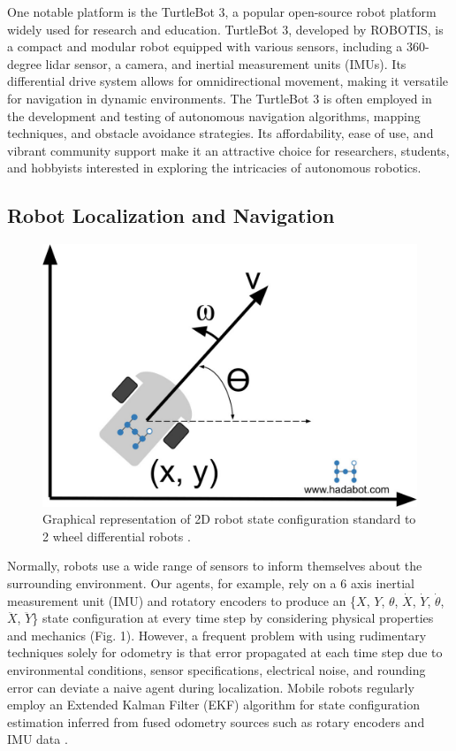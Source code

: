 \documentclass[conference]{IEEEtran}
\begin{document}
One notable platform is the TurtleBot 3, a popular open-source robot platform widely used for research and education. TurtleBot 3, developed by ROBOTIS, is a compact and modular robot equipped with various sensors, including a 360-degree lidar sensor, a camera, and inertial measurement units (IMUs). Its differential drive system allows for omnidirectional movement, making it versatile for navigation in dynamic environments. The TurtleBot 3 is often employed in the development and testing of autonomous navigation algorithms, mapping techniques, and obstacle avoidance strategies. Its affordability, ease of use, and vibrant community support make it an attractive choice for researchers, students, and hobbyists interested in exploring the intricacies of autonomous robotics.

\subsection{Robot Localization and Navigation}
\begin{figure}
	\includegraphics[width=\linewidth]{./figs/hadabot_unicycle_diagram_01.jpg}
	\caption{Graphical representation of 2D robot state configuration standard to 2 wheel differential robots \cite{RN100}.}
\end{figure}
Normally, robots use a wide range of sensors to inform themselves about the surrounding environment. Our agents, for example, rely on a 6 axis inertial measurement unit (IMU) and rotatory encoders to produce an \{$X$, $Y$, $\theta$, $\dot{X}$, $\dot{Y}$, $\dot{\theta}$, $\ddot{X}$, $\ddot{Y}$\} state configuration at every time step by considering physical properties and mechanics (Fig. 1). However, a frequent problem with using rudimentary techniques solely for odometry is that error propagated at each time step due to environmental conditions, sensor specifications, electrical noise, and rounding error can deviate a naive agent during localization. Mobile robots regularly employ an Extended Kalman Filter (EKF) algorithm for state configuration estimation inferred from fused odometry sources such as rotary encoders and IMU data \cite{RN102}.
\end{document}
